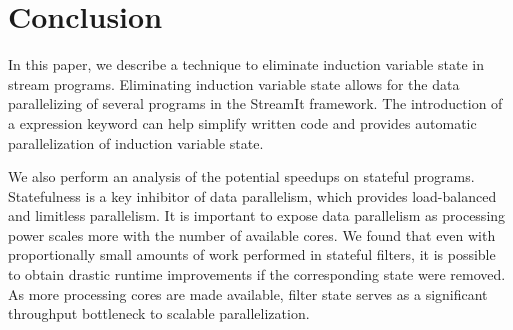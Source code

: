 \section{Conclusion}
\label{sec:conclusion}

In this paper, we describe a technique to eliminate induction variable state in stream programs.  Eliminating induction variable state allows for the data parallelizing of several programs in the StreamIt framework.  The introduction of a expression keyword can help simplify written code and provides automatic parallelization of induction variable state.  

We also perform an analysis of the potential speedups on stateful programs.  Statefulness is a key inhibitor of data parallelism, which provides load-balanced and limitless parallelism.  It is important to expose data parallelism as processing power scales more with the number of available cores.  We found that even with proportionally small amounts of work performed in stateful filters, it is possible to obtain drastic runtime improvements if the corresponding state were removed.  As more processing cores are made available, filter state serves as a significant throughput bottleneck to scalable parallelization.


